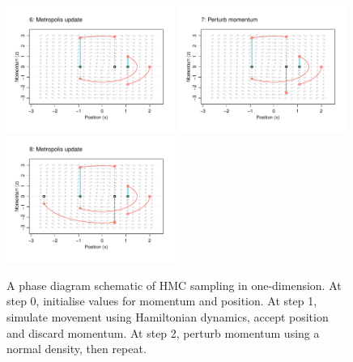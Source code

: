\begin{figure}[p]
  \includegraphics[width=0.49\textwidth]{figure/04-phase6}
  \vspace{-20pt}  
  \includegraphics[width=0.49\textwidth]{figure/04-phase7}
  \includegraphics[width=0.49\textwidth]{figure/04-phase8}
  \caption{A phase diagram schematic of HMC sampling in one-dimension. At step 0, initialise values for momentum and position. At step 1, simulate movement using Hamiltonian dynamics, accept position and discard momentum. At step 2, perturb momentum using a normal density, then repeat.}
\end{figure}





















